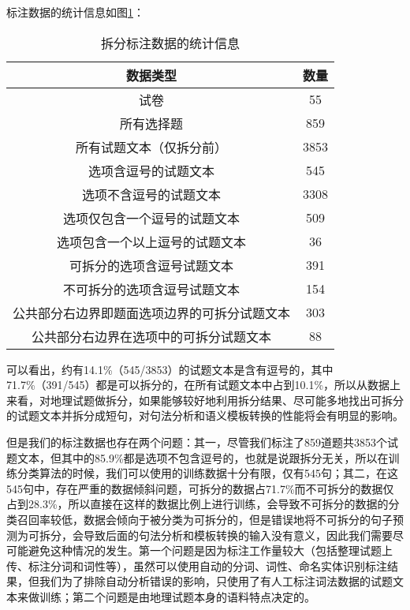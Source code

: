 \documentclass[master, winfont]{njuthesis}
\begin{document}
标注数据的统计信息如图\ref{data_count}：
\begin{table}
\begin{center}
\begin{tabular}{c|c}
\hline {数据类型} & {数量}\\
\hline 试卷 & 55\\
\hline 所有选择题 & 859 \\
\hline 所有试题文本（仅拆分前） & 3853\\
\hline 选项含逗号的试题文本 & 545\\
\hline 选项不含逗号的试题文本 & 3308 \\
\hline 选项仅包含一个逗号的试题文本 & 509\\
\hline 选项包含一个以上逗号的试题文本 & 36\\
\hline 可拆分的选项含逗号试题文本 & 391\\
\hline 不可拆分的选项含逗号试题文本 & 154\\
\hline 公共部分右边界即题面选项边界的可拆分试题文本 & 303 \\
\hline 公共部分右边界在选项中的可拆分试题文本 & 88 \\
\hline
\end{tabular}
\end{center}
\caption{\label{data_count} 拆分标注数据的统计信息}
\end{table}

可以看出，约有14.1\%（545/3853）的试题文本是含有逗号的，其中71.7\%（391/545）都是可以拆分的，在所有试题文本中占到10.1\%，所以从数据上来看，对地理试题做拆分，如果能够较好地利用拆分结果、尽可能多地找出可拆分的试题文本并拆分成短句，对句法分析和语义模板转换的性能将会有明显的影响。

但是我们的标注数据也存在两个问题：其一，尽管我们标注了859道题共3853个试题文本，但其中的85.9\%都是选项不包含逗号的，也就是说跟拆分无关，所以在训练分类算法的时候，我们可以使用的训练数据十分有限，仅有545句；其二，在这545句中，存在严重的数据倾斜问题，可拆分的数据占71.7\%而不可拆分的数据仅占到28.3\%，所以直接在这样的数据比例上进行训练，会导致不可拆分的数据的分类召回率较低，数据会倾向于被分类为可拆分的，但是错误地将不可拆分的句子预测为可拆分，会导致后面的句法分析和模板转换的输入没有意义，因此我们需要尽可能避免这种情况的发生。第一个问题是因为标注工作量较大（包括整理试题上传、标注分词和词性等），虽然可以使用自动的分词、词性、命名实体识别标注结果，但我们为了排除自动分析错误的影响，只使用了有人工标注词法数据的试题文本来做训练；第二个问题是由地理试题本身的语料特点决定的。
\end{document}
